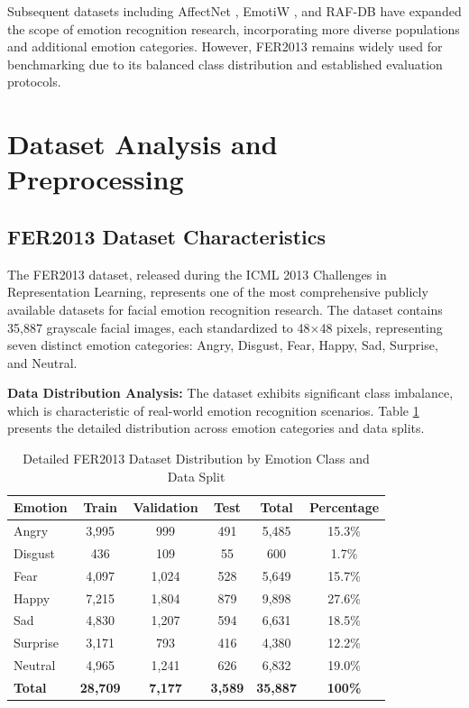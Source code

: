 \documentclass[conference]{IEEEtran}
\begin{document}
Subsequent datasets including AffectNet \cite{mollahosseini2017affectnet}, EmotiW \cite{dhall2017emotiw}, and RAF-DB \cite{li2017reliable} have expanded the scope of emotion recognition research, incorporating more diverse populations and additional emotion categories. However, FER2013 remains widely used for benchmarking due to its balanced class distribution and established evaluation protocols.

\section{Dataset Analysis and Preprocessing}

\subsection{FER2013 Dataset Characteristics}
The FER2013 dataset, released during the ICML 2013 Challenges in Representation Learning, represents one of the most comprehensive publicly available datasets for facial emotion recognition research. The dataset contains 35,887 grayscale facial images, each standardized to 48×48 pixels, representing seven distinct emotion categories: Angry, Disgust, Fear, Happy, Sad, Surprise, and Neutral.

\textbf{Data Distribution Analysis:}
The dataset exhibits significant class imbalance, which is characteristic of real-world emotion recognition scenarios. Table \ref{tab:dataset-distribution} presents the detailed distribution across emotion categories and data splits.

\begin{table}[h]
\centering
\caption{Detailed FER2013 Dataset Distribution by Emotion Class and Data Split}
\label{tab:dataset-distribution}
\begin{tabular}{|l|c|c|c|c|c|}
\hline
\textbf{Emotion} & \textbf{Train} & \textbf{Validation} & \textbf{Test} & \textbf{Total} & \textbf{Percentage} \\
\hline
Angry & 3,995 & 999 & 491 & 5,485 & 15.3\% \\
Disgust & 436 & 109 & 55 & 600 & 1.7\% \\
Fear & 4,097 & 1,024 & 528 & 5,649 & 15.7\% \\
Happy & 7,215 & 1,804 & 879 & 9,898 & 27.6\% \\
Sad & 4,830 & 1,207 & 594 & 6,631 & 18.5\% \\
Surprise & 3,171 & 793 & 416 & 4,380 & 12.2\% \\
Neutral & 4,965 & 1,241 & 626 & 6,832 & 19.0\% \\
\hline
\textbf{Total} & \textbf{28,709} & \textbf{7,177} & \textbf{3,589} & \textbf{35,887} & \textbf{100\%} \\
\hline
\end{tabular}
\end{table}
\end{document}
